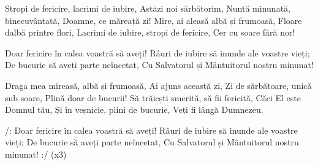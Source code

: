 \beginverse
Stropi de fericire, lacrimi de iubire,
Astăzi noi sărbătorim,
Nuntă minunată, binecuvântată,
Doamne, ce măreață zi!
Mire, ai aleasă albă și frumoasă,
Floare dalbă printre flori,
Lacrimi de iubire, stropi de fericire,
Cer cu soare fără nor!
\endverse

\beginchorus
Doar fericire în calea voastră să aveți!
Râuri de iubire să inunde ale voastre vieți;
De bucurie să aveți parte neîncetat,
Cu Salvatorul și Mântuitorul nostru minunat!
\endchorus

\beginverse
Draga mea mireasă, albă și frumoasă,
Ai ajuns această zi,
Zi de sărbătoare, unică sub soare,
Plină doar de bucurii!
Să trăiești smerită, să fii fericită,
Căci El este Domnul tău,
Și în veșnicie, plini de bucurie,
Veți fi lângă Dumnezeu.
\endverse

\beginchorus
/: Doar fericire în calea voastră să aveți!
Râuri de iubire să inunde ale voastre vieți;
De bucurie să aveți parte neîncetat,
Cu Salvatorul și Mântuitorul nostru minunat! :/ (x3)
\endchorus
\endsong